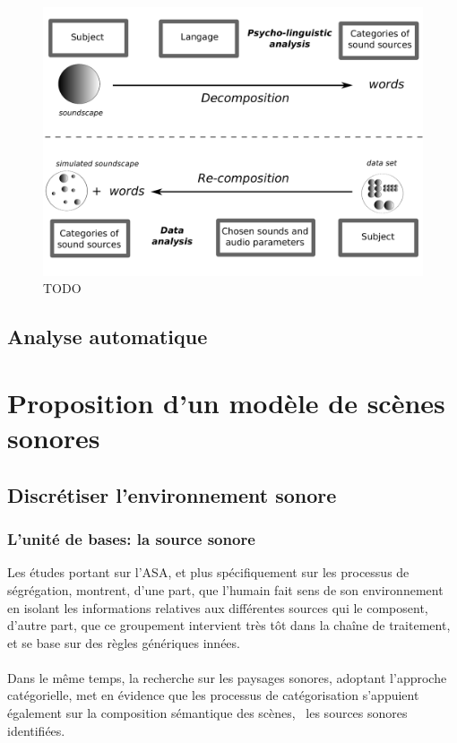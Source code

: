 \begin{figure}[t]
        \myfloatalign
        \includegraphics[width=.8\linewidth]{gfx/1}
       \caption{TODO}\label{fig:paradigmeSimu1}
\end{figure}

\subsection{Analyse automatique}

\section{Proposition d'un modèle de scènes sonores}
\label{sec:ch4_model}

\subsection{Discrétiser l'environnement sonore}
\label{sec:ch4_modelInspi}


\subsubsection{L'unité de bases: la source sonore}

Les études portant sur l'ASA, et plus spécifiquement sur les processus de ségrégation, montrent, d'une part, que l'humain fait sens de son environnement en isolant les informations relatives aux différentes sources qui le composent, d'autre part, que ce groupement intervient très tôt dans la chaîne de traitement, et se base sur des règles génériques innées.\\

 \\ 

Dans le même temps, la recherche sur les paysages sonores, adoptant l’approche catégorielle, met en évidence que les processus de catégorisation s'appuient également sur la composition sémantique des scènes, \ie~les sources sonores identifiées. 


